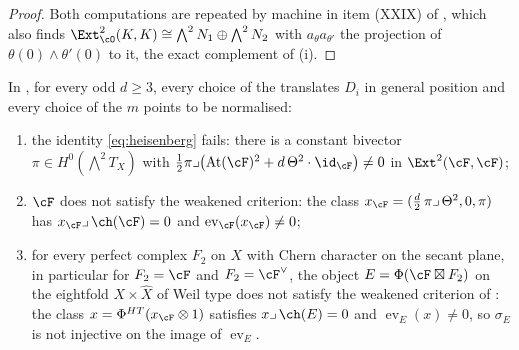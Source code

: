 \begin{proof}
Both computations are repeated by machine in item (XXIX) of
, which also finds $\Ext^{2}_{\cO}(K,K)\cong
\bigwedge^{2}N_{1}\oplus\bigwedge^{2}N_{2}$ with $a_{\theta}a_{\theta'}$ the
projection of $\theta(0)\wedge\theta'(0)$ to it, the exact complement of (i).
\end{proof}

\begin{theorem}
\label{thm:candidatefails}
In , for every odd $d\ge3$, every choice of the
translates $D_{i}$ in general position and every choice of the $m$ points to
be normalised:
\begin{enumerate}[label=\textup{(\roman*)},nosep]
\item the identity \eqref{eq:heisenberg} fails: there is a constant bivector
  $\pi\in H^{0}(\bigwedge^{2}T_{X})$ with
  $\tfrac12\pi\lrcorner\bigl(\mathrm{At}(\cF)^{2}+d\,\Theta^{2}\cdot\id_{\cF}\bigr)\ne0$
  in $\Ext^{2}(\cF,\cF)$;
\item $\cF$ does not satisfy the weakened criterion: the class
  $x_{\cF}=(\tfrac d2\,\pi\lrcorner\,\Theta^{2},0,\pi)$ has
  $x_{\cF}\lrcorner\,\ch(\cF)=0$ and $\operatorname{ev}_{\cF}(x_{\cF})\ne0$;
\item for every perfect complex $F_{2}$ on $X$ with Chern character on the
  secant plane, in particular for $F_{2}=\cF$ and $F_{2}=\cF^{\vee}$, the
  object $E=\Phi(\cF\boxtimes F_{2})$ on the eightfold $X\times\widehat X$ of
  Weil type does not satisfy the weakened criterion of
  \cite[Question 11.4]{Mar25b}: the class $x=\Phi^{HT}(x_{\cF}\otimes1)$
  satisfies $x\lrcorner\,\ch(E)=0$ and $\operatorname{ev}_{E}(x)\ne0$, so
  $\sigma_{E}$ is not injective on the image of $\operatorname{ev}_{E}$.
\end{enumerate}
\end{theorem}

